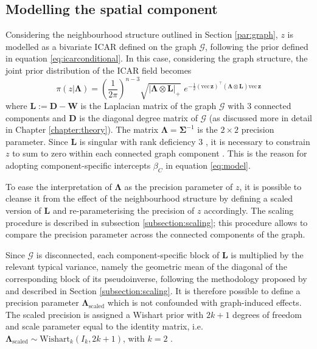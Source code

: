 \documentclass[openany, 11pt, oneside]{book}
\begin{document}
\subsection{Modelling the spatial component} \label{par:ICAR}
Considering the neighbourhood structure outlined in Section \ref{par:graph}, $z$ is modelled as a bivariate ICAR defined on the graph $\mathcal{G}$, following the prior defined in equation \ref{eq:icarconditional}.
In this case, considering the graph structure, the joint prior distribution of the ICAR field becomes
\begin{equation}
\pi\left(z\vert \boldsymbol{\Lambda} \right) =
\left( \frac{1}{2 \pi} \right)^{n-3}
\sqrt{\vert \boldsymbol{\Lambda} \otimes\boldsymbol{L}  \vert_{+}} \, \, 
 e^{\displaystyle{-\tfrac{1}{2}
(\mathrm{vec} \, \boldsymbol{z})^\top(\boldsymbol{\Lambda} \otimes \boldsymbol{L} ) \mathrm{vec}\, \boldsymbol{z}}}
\label{eq:ICAR}
\end{equation}
%
where $\boldsymbol{L} := \boldsymbol{D} - \boldsymbol{W}$ is the Laplacian matrix of the graph $\mathcal{G}$ with $3$ connected components and $\boldsymbol{D}$ is the diagonal degree matrix of $\mathcal{G}$ (as discussed more in detail in Chapter \ref{chapter:theory}). The matrix $\boldsymbol{\Lambda} =\boldsymbol{ \Sigma}^{-1}$ is the $2 \times 2$ precision parameter. 
Since $\boldsymbol{L}$ is singular with rank deficiency $3$ \parencite{Hodges2003}, it is necessary to constrain $z$ to sum to zero within each connected graph component \parencite{ICAR}. This is the reason for adopting component-specific intercepts $\beta_C$ in equation \ref{eq:model}.

To ease the interpretation of $\boldsymbol{\Lambda}$ as the precision parameter of $z$, it is possible to cleanse it from the effect of the neighbourhood structure by defining a scaled version of $\boldsymbol{L}$ \cite{Sorbye} and re-parameterising the precision of $z$ accordingly. The scaling procedure is described in subsection \ref{subsection:scaling}; this procedure allows to compare the precision parameter across the connected components of the graph.

Since $\mathcal{G}$ is disconnected, each component-specific block of $\boldsymbol{L}$ is multiplied by the relevant typical variance, namely the geometric mean of the diagonal of the corresponding block of its pseudoinverse, following the methodology proposed by \cite{Freni2018} and described in Section \ref{subsection:scaling}. It is therefore possible to define a precision parameter $\boldsymbol{\Lambda}_\mathrm{scaled}$ which is not confounded with graph-induced effects. The scaled precision is assigned a Wishart prior \parencite{Gelman} with $2k+1$ degrees of freedom and scale parameter equal to the identity matrix, i.e. $\boldsymbol{\Lambda}_\mathrm{scaled} \sim \mathrm{Wishart}_{k}( I_k, 2k+1)$, with $k=2$ \parencite{INLAMSM}.
\end{document}
